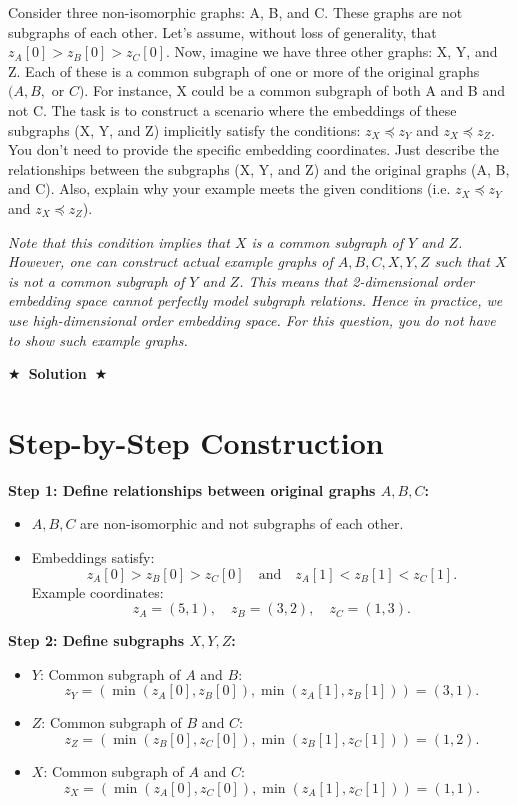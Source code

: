 \documentclass[11pt]{article}
\numberwithin{figure}{section}
\newcommand{\Solution}[1]{{\medskip \color{red} \bf $\bigstar$~\sf \textbf{Solution}~$\bigstar$ \sf #1 } \bigskip}
\begin{document}
Consider three non-isomorphic graphs: A, B, and C. These graphs are not subgraphs of each other. Let’s assume,  without loss of generality, that $z_A[0] > z_B[0] >z_C [0]$.
Now, imagine we have three other graphs: X, Y, and Z. Each of these is a common subgraph of one or more of the original graphs $(A, B, $ or $C)$. For instance, X could be a common subgraph of both A and B and not C. The task is to construct a scenario where the embeddings of these subgraphs (X, Y, and Z) implicitly satisfy the conditions: $z_X \preccurlyeq z_Y$ and $z_X \preccurlyeq z_Z$.
You don’t need to provide the specific embedding coordinates. Just describe the relationships between the subgraphs (X, Y, and Z) and the original graphs (A, B, and C). Also, explain why your example meets the given conditions (i.e. $z_X \preccurlyeq z_Y$ and $z_X \preccurlyeq z_Z$).


\textit{Note that this condition implies that $X$ is a common subgraph of $Y$ and $Z$. However, one can construct actual example graphs of $A, B, C, X, Y, Z$ such that $X$ is not a common subgraph of $Y$ and $Z$. This means that 2-dimensional order embedding space cannot perfectly model subgraph relations. Hence in practice, we use high-dimensional order embedding space. For this question, you do not have to show such example graphs.}

\Solution{}


\section*{Step-by-Step Construction}

\textbf{Step 1: Define relationships between original graphs $ A, B, C $:}
\begin{itemize}
    \item $ A, B, C $ are non-isomorphic and not subgraphs of each other.
    \item Embeddings satisfy:
    $$
    z_A[0] > z_B[0] > z_C[0] \quad \text{and} \quad z_A[1] < z_B[1] < z_C[1].
    $$
    Example coordinates:
    $$
    z_A = (5, 1), \quad z_B = (3, 2), \quad z_C = (1, 3).
    $$
\end{itemize}

\textbf{Step 2: Define subgraphs $ X, Y, Z $:}
\begin{itemize}
    \item $ Y $: Common subgraph of $ A $ and $ B $:
    $$
    z_Y = (\min(z_A[0], z_B[0]), \min(z_A[1], z_B[1])) = (3, 1).
    $$
    \item $ Z $: Common subgraph of $ B $ and $ C $:
    $$
    z_Z = (\min(z_B[0], z_C[0]), \min(z_B[1], z_C[1])) = (1, 2).
    $$
    \item $ X $: Common subgraph of $ A $ and $ C $:
    $$
    z_X = (\min(z_A[0], z_C[0]), \min(z_A[1], z_C[1])) = (1, 1).
    $$
\end{itemize}
\end{document}
